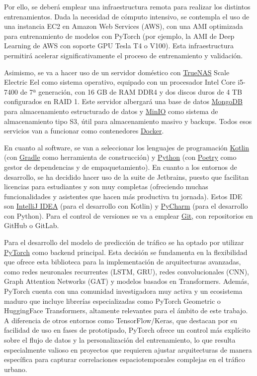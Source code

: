 Por ello, se deberá emplear una infraestructura remota para realizar los distintos entrenamientos. Dada la necesidad de cómputo intensivo, se contempla el uso de una instancia EC2 en Amazon Web Services (AWS), con una AMI optimizada para entrenamiento de modelos con PyTorch (por ejemplo, la AMI de Deep Learning de AWS con soporte GPU Tesla T4 o V100). Esta infraestructura permitirá acelerar significativamente el proceso de entrenamiento y validación.

Asimismo, se va a hacer uso de un servidor doméstico con \href{https://www.truenas.com/}{TrueNAS} Scale Electric Eel como sistema operativo, equipado con un procesador Intel Core i5-7400 de 7ª generación, con 16 GB de RAM DDR4 y dos discos duros de 4 TB configurados en RAID 1. Este servidor albergará una base de datos \href{https://www.mongodb.com/}{MongoDB} para almacenamiento estructurado de datos y \href{https://min.io/}{MinIO} como sistema de almacenamiento tipo S3, útil para almacenamiento masivo y backups. Todos esos servicios van a funcionar como contenedores \href{https://www.docker.com/}{Docker}.

En cuanto al software, se van a seleccionar los lenguajes de programación \href{https://kotlinlang.org/}{Kotlin} (con \href{https://gradle.org/}{Gradle} como herramienta de construcción) y \href{https://www.python.org/}{Python} (con \href{https://python-poetry.org/}{Poetry} como gestor de dependencias y de empaquetamiento). En cuanto a los entornos de desarrollo, se ha decidido hacer uso de la suite de Jetbrains, puesto que facilitan licencias para estudiantes y son muy completas (ofreciendo muchas funcionalidades y asistentes que hacen más productiva tu jornada). Estos IDE son \href{https://www.jetbrains.com/es-es/idea/}{IntelliJ IDEA} (para el desarrollo con Kotlin) y \href{https://www.jetbrains.com/es-es/pycharm/}{PyCharm} (para el desarrollo con Python). Para el control de versiones se va a emplear \href{https://git-scm.com/}{Git}, con repositorios en GitHub o GitLab.

Para el desarrollo del modelo de predicción de tráfico se ha optado por utilizar \href{https://pytorch.org/}{PyTorch} como backend principal. Esta decisión se fundamenta en la flexibilidad que ofrece esta biblioteca para la implementación de arquitecturas avanzadas, como redes neuronales recurrentes (LSTM, GRU), redes convolucionales (CNN), Graph Attention Networks (GAT) y modelos basados en Transformers. Además, PyTorch cuenta con una comunidad investigadora muy activa y un ecosistema maduro que incluye librerías especializadas como PyTorch Geometric o HuggingFace Transformers, altamente relevantes para el ámbito de este trabajo. A diferencia de otros entornos como TensorFlow/Keras, que destacan por su facilidad de uso en fases de prototipado, PyTorch ofrece un control más explícito sobre el flujo de datos y la personalización del entrenamiento, lo que resulta especialmente valioso en proyectos que requieren ajustar arquitecturas de manera específica para capturar correlaciones espaciotemporales complejas en el tráfico urbano. 

